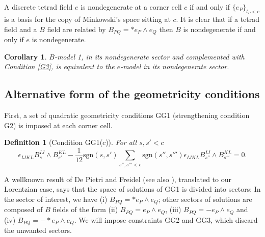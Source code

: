 \documentclass{article}
\newtheorem{corollary}{Corollary}
\newtheorem{definition}{Definition}
\begin{document}
A discrete tetrad field $e$ is nondegenerate at a corner cell $c$ if and only if $\{e_P\}_{l_P<c}$ is a basis for the copy of Minkowski's space sitting at $c$. It is clear that if a tetrad field and a $B$ field are related by $B_{PQ} = \ast e_P \wedge e_Q$ then $B$ is nondegenerate if and only if $e$ is nondegenerate. 

\begin{corollary}\label{Cor1}
$B$-model 1, in its nondegenerate sector and complemented with Condition \ref{G3}, is equivalent to the $e$-model in its nondegenerate sector. 
\end{corollary}

%
%
%
%
%


\subsection{Alternative form of the geometricity conditions}
\label{AlternativeGeoCond}

First, a set of quadratic geometricity conditions GG1 (strengthening condition G2) is imposed at each corner cell. 

\begin{definition}[Condition GG1($c$)]\label{GG1}
For all $s, s' < c$ 
\[
	\epsilon_{IJKL}B_s^{IJ}\wedge B_{s'}^{KL} - \frac{1}{12} \text{sgn}(s,s')
	\sum_{s'', s''' <c}
	\text{sgn}(s'',s''')\epsilon_{IJKL}B_{s''}^{IJ}\wedge B_{s'''}^{KL} = 0 . 
\] 
\end{definition}

A wellknown result of De Pietri and Freidel \cite{FD} (see also \cite{Thi}), translated to our Lorentzian case, says that the space of solutions of GG1 is divided into sectors: In the sector of interest, we have (i) $B_{PQ} = \ast e_P \wedge e_Q$;  other sectors of solutions are composed of $B$ fields of the form (ii) $B_{PQ} = e_P \wedge e_Q$, (iii) $B_{PQ} = - e_P \wedge e_Q$ and (iv) $B_{PQ} = - \ast e_P \wedge e_Q$. We will impose constraints GG2 and GG3, which discard the unwanted sectors. 
\end{document}
